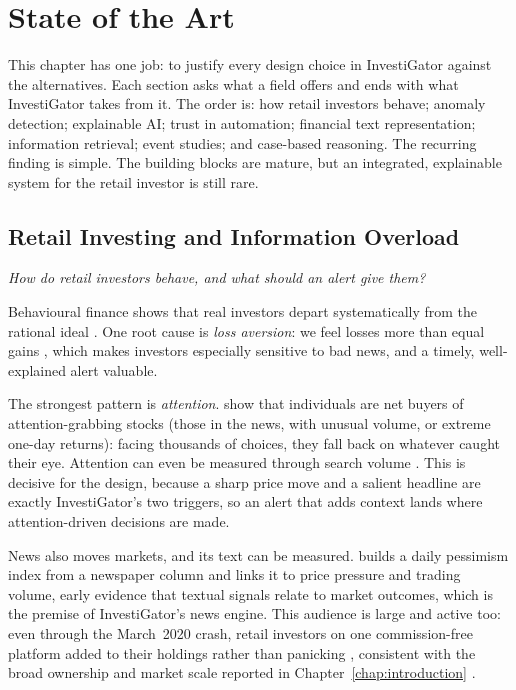 
\chapter{State of the Art}
\label{chap:sota}

This chapter has one job: to justify every design choice in InvestiGator against the alternatives. Each section
asks what a field offers and ends with what InvestiGator takes from it. The order is: how retail investors
behave; anomaly detection; explainable AI; trust in automation; financial text representation; information
retrieval; event studies; and case-based reasoning. The recurring finding is simple. The building blocks
are mature, but an integrated, explainable system for the retail investor is still rare.

\section{Retail Investing and Information Overload}
\label{sec:sota_retail}

\emph{How do retail investors behave, and what should an alert give them?}

Behavioural finance shows that real investors depart systematically from the rational ideal
\autocite{barberis2003behavioral}. One root cause is \emph{loss aversion}: we feel losses more than equal
gains \autocite{kahneman1979prospect}, which makes investors especially sensitive to bad news, and a
timely, well-explained alert valuable.

The strongest pattern is \emph{attention}. \textcite{barber2008glitters} show that individuals are net
buyers of attention-grabbing stocks (those in the news, with unusual volume, or extreme one-day returns):
facing thousands of choices, they fall back on whatever caught their eye. Attention can even be measured
through search volume \autocite{da2011attention}. This is decisive for the design, because a sharp price
move and a salient headline are exactly InvestiGator's two triggers, so an alert that adds context lands where
attention-driven decisions are made.

News also moves markets, and its text can be measured. \textcite{tetlock2007media} builds a daily
pessimism index from a newspaper column and links it to price pressure and trading volume, early
evidence that textual signals relate to market outcomes, which is the premise of InvestiGator's news
engine. This
audience is large and active too: even through the March~2020 crash, retail investors on one
commission-free platform added to their holdings rather than panicking \autocite{welch2022robinhood},
consistent with the broad ownership and market scale reported in Chapter~\ref{chap:introduction}
\autocite{gallup2025stock, sifma2025factbook}.

